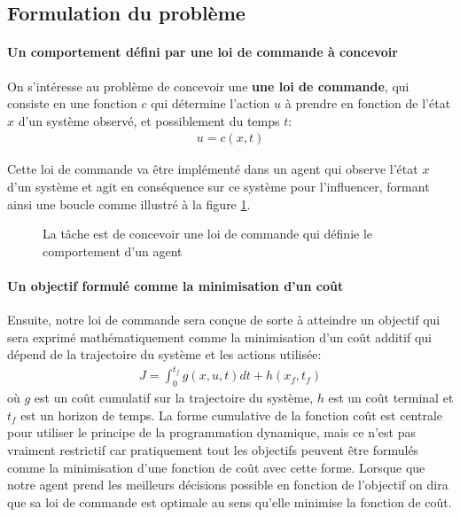 \subsection{Formulation du problème}

\paragraph{Un comportement défini par une loi de commande à concevoir}
On s'intéresse au problème de concevoir une \textbf{une loi de commande}, qui consiste en une fonction $c$ qui détermine l'action $u$ à prendre en fonction de l'état $x$ d'un système observé, et possiblement du temps $t$:
\begin{align}
u = c( x, t )
\end{align}

Cette loi de commande va être implémenté dans un agent qui observe l'état $x$ d'un système et agit en conséquence sur ce système pour l'influencer, formant ainsi une boucle comme illustré à la figure \ref{fig:agent}. 

\begin{figure}[H]
	\centering
	\vspace{-10pt}
		\caption{La tâche est de concevoir une loi de commande qui définie le comportement d'un agent}
		\label{fig:agent}
\end{figure}

\paragraph{Un objectif formulé comme la minimisation d'un coût}
Ensuite, notre loi de commande sera conçue de sorte à atteindre un objectif qui sera exprimé mathématiquement comme la minimisation d'un coût additif qui dépend de la trajectoire du système et les actions utilisée:
\begin{align}
    J=\int_0^{t_f}g(x,u,t) dt + h(x_f,t_f)
\end{align}
où $g$ est un coût cumulatif sur la trajectoire du système, $h$ est un coût terminal et $t_f$ est un horizon de temps. La forme cumulative de la fonction coût est centrale pour utiliser le principe de la programmation dynamique, mais ce n'est pas vraiment restrictif car pratiquement tout les objectifs peuvent être formulés comme la minimisation d'une fonction de coût avec cette forme. Lorsque que notre agent prend les meilleurs décisions possible en fonction de l'objectif on dira que sa loi de commande est optimale au sens qu'elle minimise la fonction de coût. 

